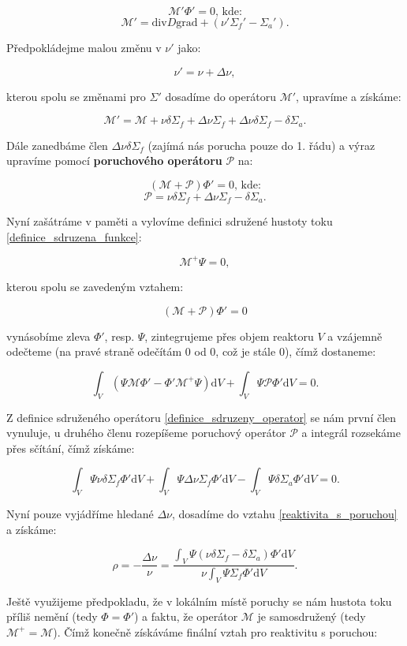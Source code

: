 $$ \mathcal{M'} \Phi' = 0 \text{, kde:} $$
$$ \mathcal{M'} = \text{div} D \text{grad} + (\nu' \Sigma_f' - \Sigma_a'). $$

Předpokládejme malou změnu v $\nu'$ jako:

$$ \nu' = \nu + \Delta \nu, $$

kterou spolu se změnami pro $\Sigma'$ dosadíme do operátoru $\mathcal{M'}$, upravíme a získáme:

$$ \mathcal{M'} = \mathcal{M} + \nu \delta \Sigma_f + \Delta \nu \Sigma_f + \Delta \nu \delta \Sigma_f - \delta \Sigma_a. $$

Dále zanedbáme člen $\Delta \nu \delta \Sigma_f$ (zajímá nás porucha pouze do 1. řádu) a výraz upravíme pomocí \textbf{poruchového operátoru} $\mathcal{P}$ na:

$$ (\mathcal{M} + \mathcal{P}) \Phi' = 0 \text{, kde:} $$
$$ \mathcal{P} = \nu \delta \Sigma_f + \Delta \nu \Sigma_f - \delta \Sigma_a. $$

Nyní zašátráme v paměti a vylovíme definici sdružené hustoty toku \eqref{definice_sdruzena_funkce}:

$$ \mathcal{M^+} \Psi = 0, $$

kterou spolu se zavedeným vztahem:

$$ (\mathcal{M} + \mathcal{P}) \Phi' = 0 $$

vynásobíme zleva $\Phi'$, resp. $\Psi$, zintegrujeme přes objem reaktoru $V$ a vzájemně odečteme (na pravé straně odečítám 0 od 0, což je stále 0), čímž dostaneme:

$$ \int_V (\Psi \mathcal{M} \Phi' - \Phi' \mathcal{M^+} \Psi) \text{d}V + \int_V \Psi \mathcal{P} \Phi' \text{d}V = 0. $$

Z definice sdruženého operátoru \eqref{definice_sdruzeny_operator} se nám první člen vynuluje, u druhého členu rozepíšeme poruchový operátor $\mathcal{P}$ a integrál rozsekáme přes sčítání, čímž získáme:

$$ \int_V \Psi \nu \delta \Sigma_f \Phi' \text{d}V + \int_V \Psi \Delta \nu \Sigma_f \Phi' \text{d}V - \int_V \Psi \delta \Sigma_a \Phi' \text{d}V = 0. $$

Nyní pouze vyjádříme hledané $\Delta \nu$, dosadíme do vztahu \eqref{reaktivita_s_poruchou} a získáme:

$$ \rho = - \dfrac{\Delta \nu}{\nu} = \dfrac{\int_V \Psi (\nu \delta \Sigma_f - \delta \Sigma_a) \Phi' \text{d}V}{\nu \int_V \Psi \Sigma_f \Phi' \text{d}V}. $$

Ještě využijeme předpokladu, že v lokálním místě poruchy se nám hustota toku příliš nemění (tedy $\Phi = \Phi'$) a faktu, že operátor $\mathcal{M}$ je samosdružený (tedy $\mathcal{M^+} = \mathcal{M}$). Čímž konečně získáváme finální vztah pro reaktivitu s poruchou:

